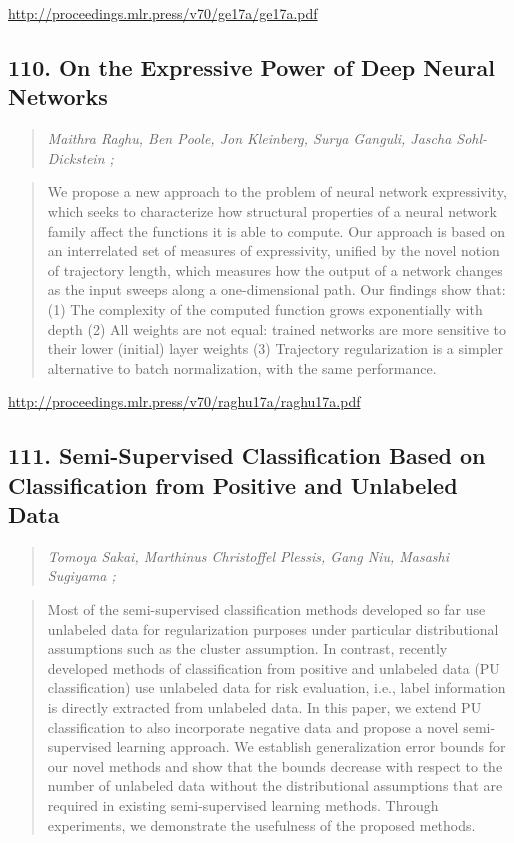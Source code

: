 \documentclass{article}
\begin{document}
\href{http://proceedings.mlr.press/v70/ge17a/ge17a.pdf}{http://proceedings.mlr.press/v70/ge17a/ge17a.pdf}

\subsection{110. On the Expressive Power of Deep Neural Networks}

\begin{quote}
\footnotesize{\textit{Maithra Raghu, Ben Poole, Jon Kleinberg, Surya Ganguli, Jascha Sohl-Dickstein ;}}

\end{quote}

\begin{quote}
    We propose a new approach to the problem of neural network expressivity, which seeks to characterize how structural properties of a neural network family affect the functions it is able to compute. Our approach is based on an interrelated set of measures of expressivity, unified by the novel notion of trajectory length, which measures how the output of a network changes as the input sweeps along a one-dimensional path. Our findings show that: (1) The complexity of the computed function grows exponentially with depth (2) All weights are not equal: trained networks are more sensitive to their lower (initial) layer weights (3) Trajectory regularization is a simpler alternative to batch normalization, with the same performance.  
\end{quote}

\href{http://proceedings.mlr.press/v70/raghu17a/raghu17a.pdf}{http://proceedings.mlr.press/v70/raghu17a/raghu17a.pdf}

\subsection{111. Semi-Supervised Classification Based on Classification from Positive and Unlabeled Data}

\begin{quote}
\footnotesize{\textit{Tomoya Sakai, Marthinus Christoffel Plessis, Gang Niu, Masashi Sugiyama ;}}

\end{quote}

\begin{quote}
    Most of the semi-supervised classification methods developed so far use unlabeled data for regularization purposes under particular distributional assumptions such as the cluster assumption. In contrast, recently developed methods of classification from positive and unlabeled data (PU classification) use unlabeled data for risk evaluation, i.e., label information is directly extracted from unlabeled data. In this paper, we extend PU classification to also incorporate negative data and propose a novel semi-supervised learning approach. We establish generalization error bounds for our novel methods and show that the bounds decrease with respect to the number of unlabeled data without the distributional assumptions that are required in existing semi-supervised learning methods. Through experiments, we demonstrate the usefulness of the proposed methods.  
\end{quote}
\end{document}
